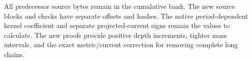 \documentclass[11pt]{article}
\begin{document}
All predecessor source bytes remain in the cumulative bank. The new source blocks and checks have separate offsets and hashes. The native period-dependent kernel coefficient and separate projected-current signs remain the values to calculate. The new proofs provide positive depth increments, tighter mass intervals, and the exact metric/current correction for removing complete long chains.
\end{document}
